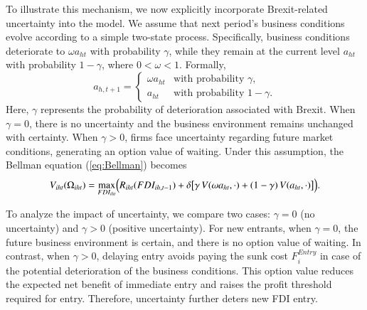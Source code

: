 \documentclass[preprint,11pt,authoryear]{elsarticle}
\begin{document}
To illustrate this mechanism, we now explicitly incorporate Brexit-related uncertainty into the model. We assume that next period's business conditions evolve according to a simple two-state process.
Specifically, business conditions deteriorate to $\omega a_{ht}$ with probability $\gamma$, while they remain at the current level $a_{ht}$ with probability $1-\gamma$, where $0 < \omega < 1$. Formally,
$$
a_{h,t+1} =
\begin{cases}
\omega a_{ht} & \text{with probability } \gamma, \\
a_{ht} & \text{with probability } 1-\gamma.
\end{cases}
$$
Here, $\gamma$ represents the probability of deterioration associated with Brexit. 
When $\gamma = 0$, there is no uncertainty and the business environment remains unchanged with certainty. 
When $\gamma > 0$, firms face uncertainty regarding future market conditions, generating an option value of waiting.
Under this assumption, the Bellman equation (\ref{eq:Bellman}) becomes
\begin{align}
V_{iht}(\Omega_{iht}) 
= \max_{FDI_{iht}} \Bigl( R_{iht}(FDI_{ih,t-1})  + \delta \bigl[ \gamma \, V(\omega a_{ht}, \cdot) 
+ (1-\gamma) \, V(a_{ht}, \cdot) \bigr] \Bigr).
\end{align}

To analyze the impact of uncertainty, we compare two cases: $\gamma = 0$ (no uncertainty) and $\gamma > 0$ (positive uncertainty).
For new entrants, when $\gamma = 0$, the future business environment is certain, and there is no option value of waiting. 
In contrast, when $\gamma > 0$, delaying entry avoids paying the sunk cost $F_i^{Entry}$ in case of the potential deterioration of the business conditions. 
This option value reduces the expected net benefit of immediate entry and raises the profit threshold required for entry. 
Therefore, uncertainty further deters new FDI entry.
\end{document}
